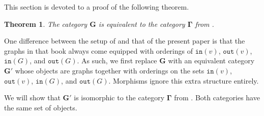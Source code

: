 \documentclass{amsart}
\newtheorem{theorem}{Theorem}
\numberwithin{theorem}{subsection}
\theoremstyle{definition}
\newcommand{\bbY}{\mathbf{G}}
\newcommand{\hryGamma}{\mathbf{\Gamma}}
\newcommand{\out}{\mathtt{out}}
\newcommand{\inp}{\mathtt{in}}
\begin{document}
This section is devoted to a proof of the following theorem.

\begin{theorem}\label{theorem upsilon equivalent definitions}
The category $\bbY$ is equivalent to the category $\hryGamma$ from \cite{hrybook}.
\end{theorem}

One difference between the setup of \cite{hrybook} and that of the present paper is that the graphs in that book always come equipped with orderings of $\inp(v)$, $\out(v)$, $\inp(G)$, and $\out(G)$.
As such, we first replace $\bbY$ with an equivalent category $\bbY'$ whose objects are graphs together with orderings on the sets $\inp(v)$, $\out(v)$, $\inp(G)$, and $\out(G)$.
Morphisms ignore this extra structure entirely.


We will show that $\bbY'$ is isomorphic to the category $\hryGamma$ from \cite{hrybook}.
Both categories have the same set of objects.
\end{document}
